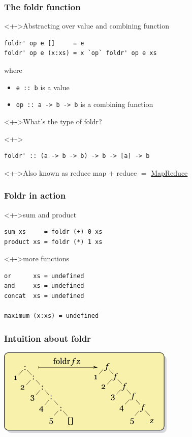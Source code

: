 \documentclass{beamer}
\begin{document}
\begin{frame}[fragile]
  \frametitle{The foldr function}
  \begin{block}<+->{Abstracting over value and combining function}
\begin{verbatim}
foldr' op e []     = e
foldr' op e (x:xs) = x `op` foldr' op e xs
\end{verbatim}
    where
    \begin{itemize}
    \item \texttt{e :: b} is a value
    \item \texttt{op :: a -> b -> b} is a combining function
    \end{itemize}
  \end{block}
  \begin{alertblock}<+->{What's the type of foldr?}
    \vspace{-\baselineskip}
  \end{alertblock}
  \begin{block}<+->{}
\begin{verbatim}
foldr' :: (a -> b -> b) -> b -> [a] -> b
\end{verbatim}
  \end{block}
  \begin{alertblock}<+->{Also known as reduce}
    map $+$ reduce $=$ \href{https://en.wikipedia.org/wiki/MapReduce}{MapReduce}
  \end{alertblock}
\end{frame}
\begin{frame}[fragile]
  \frametitle{Foldr in action}
  \begin{block}<+->{sum and product}
\begin{verbatim}
sum xs     = foldr (+) 0 xs
product xs = foldr (*) 1 xs
\end{verbatim}
  \end{block}
  \begin{block}<+->{more functions}
\begin{verbatim}
or      xs = undefined
and     xs = undefined
concat  xs = undefined

maximum (x:xs) = undefined
\end{verbatim}
  \end{block}
\end{frame}
\begin{frame}
  \frametitle{Intuition about foldr}
  \begin{center}
    \includegraphics{Right-fold-transformation}
  \end{center}
\end{frame}
\end{document}
